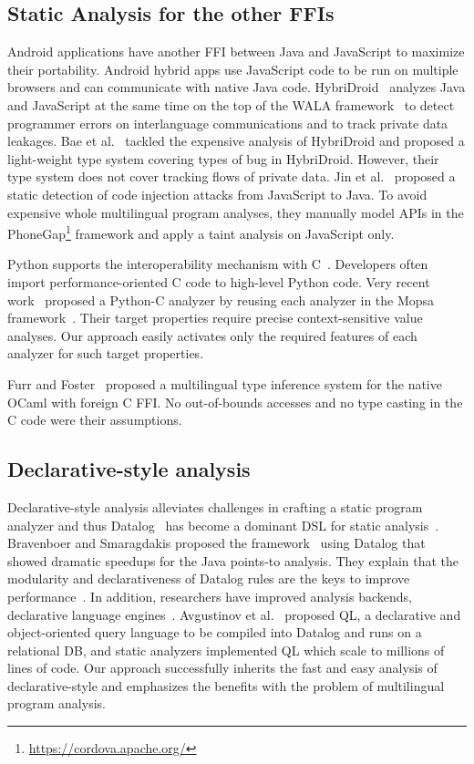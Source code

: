\subsection{Static Analysis for the other FFIs}
Android applications have another FFI between Java and JavaScript to maximize
their portability.  Android hybrid apps use JavaScript code to be run on
multiple browsers and can communicate with native Java code.
HybriDroid~\cite{hybridroid} analyzes Java and JavaScript at the same time on
the top of the WALA framework~\cite{WALA} to detect programmer errors on interlanguage
communications and to track private data leakages.  Bae et al.~\cite{BaeICSE19}
tackled the expensive analysis of HybriDroid and proposed a light-weight type
system covering types of bug in HybriDroid.  However, their type system does not
cover tracking flows of private data.  Jin et al.~\cite{jin2014code} proposed a
static detection of code injection attacks from JavaScript to Java.  To avoid
expensive whole multilingual program analyses, they manually model APIs in the
PhoneGap\footnote{\url{https://cordova.apache.org/}} framework and apply a taint
analysis on JavaScript only.

Python supports the interoperability mechanism with C~\cite{PythonC}.
Developers often import performance-oriented C code to high-level Python code.
Very recent work~\cite{sas2021} proposed a Python-C analyzer by reusing each
analyzer in the Mopsa framework~\cite{Mopsa}.  Their target properties require
precise context-sensitive value analyses.  Our approach easily activates only
the required features of each analyzer for such target properties.

Furr and Foster~\cite{furr2005, furr2008} proposed a multilingual type inference
system for the native OCaml with foreign C FFI.  No out-of-bounds accesses and
no type casting in the C code were their assumptions.

\subsection{Declarative-style analysis}
Declarative-style analysis alleviates challenges in crafting a static program
analyzer and thus Datalog~\cite{allen2015D, allen2015stagedD, alpuente2010D, doop, dawson1996D, naik2006D, reps1994D, smaragdakis2014D, whaley2005D} has become a dominant
DSL for static analysis~\cite{scholz2016}.
Bravenboer and Smaragdakis proposed the \doop framework~\cite{doop} using Datalog
that showed dramatic speedups for the Java points-to analysis.  They explain that
the modularity and declarativeness of Datalog rules are the keys to improve
performance~\cite{doopWorkshop}.  In addition, researchers have improved
analysis backends, declarative language engines~\cite{whaley2005D, hoder2011muz, souffle, madsen2016}.
Avgustinov et al.~\cite{ql2016} proposed QL, a declarative and object-oriented
query language to be compiled into Datalog and runs on a relational DB, and static
analyzers implemented QL which scale to millions of lines of code.
Our approach successfully inherits the fast and easy analysis of declarative-style
and emphasizes the benefits with the problem of multilingual program analysis.
